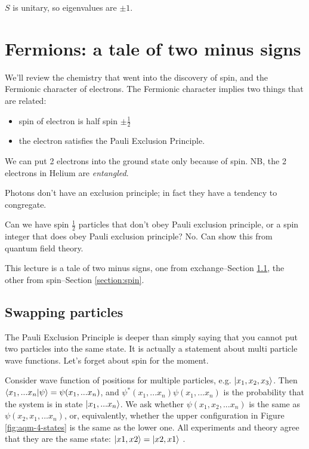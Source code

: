 \documentclass[]{article}
\begin{document}
$S$ is unitary, so eigenvalues are $\pm1$.

\section{Fermions: a tale of two minus signs}


We'll review the chemistry that went into the discovery of spin, and the Fermionic character of electrons. The Fermionic character implies two things that are related:
\begin{itemize}
	\item spin of electron is half spin $\pm \frac{1}{2}$
	\item the electron satisfies the Pauli Exclusion Principle.
\end{itemize} 

We can put 2 electrons into the ground state only because of spin. NB, the 2 electrons in Helium are \textit{entangled}.

Photons don't have an exclusion principle; in fact they have a tendency to congregate.
 
Can we have spin $\frac{1}{2}$ particles that don't obey Pauli exclusion principle, or a spin integer that does obey Pauli exclusion principle? No. Can show this from quantum field theory.

This lecture is a tale of two minus signs, one from exchange--Section \ref{section:swap},  the other from spin--Section \ref{section:spin}.

\subsection{Swapping particles}\label{section:swap}

The Pauli Exclusion Principle is deeper than simply saying that you cannot put two particles into the same state. It is actually a statement about multi particle wave functions. Let's forget about spin for the moment.

Consider wave function of positions for multiple particles, e.g. $\ket{x_1,x_2,x_3}$. Then $\braket{x_1,...x_n|\psi}=\psi(x_1,...x_n)$, and $\psi^*(x_1,...x_n)\psi(x_1,...x_n)$ is the probability that the system is in state $\ket{x_1,...x_n}$. We ask whether $\psi(x_1,x_2,...x_n)$ is the same as $\psi(x_2,x_1,...x_n)$, or, equivalently, whether the upper configuration in Figure \ref{fig:aqm-4-states} is the same as the lower one. All experiments and theory agree that they are the same state: $\ket{x1,x2}=\ket{x2,x1}$ .
\end{document}

